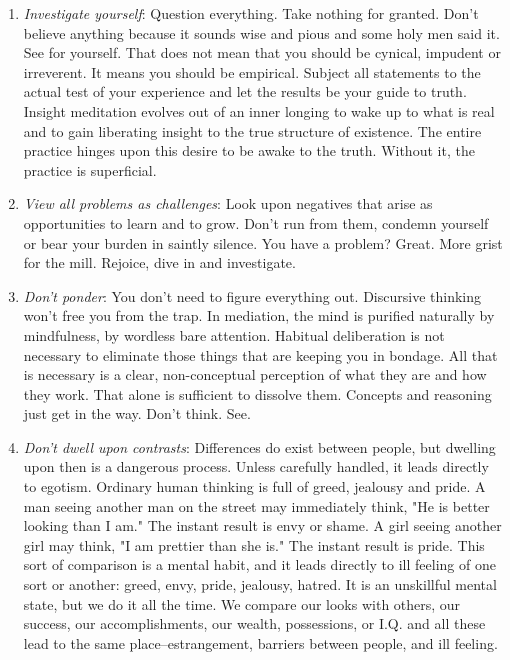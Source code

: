 \begin{enumerate}
\item \emph{Investigate yourself}: Question everything. Take nothing for granted. Don't
believe anything because it sounds wise and pious and some holy men said it. See
for yourself. That does not mean that you should be cynical, impudent or
irreverent. It means you should be empirical. Subject all statements to the
actual test of your experience and let the results be your guide to truth.
Insight meditation evolves out of an inner longing to wake up to what is real
and to gain liberating insight to the true structure of existence. The entire
practice hinges upon this desire to be awake to the truth.
Without it, the practice is superficial.

\item \emph{View all problems as challenges}: Look upon negatives that arise as
opportunities to learn and to grow. Don't run from them, condemn yourself or
bear your burden in saintly silence. You have a problem? Great. More grist for
the mill.  Rejoice, dive in and investigate.

\item \emph{Don't ponder}: You don't need to figure everything out. Discursive
thinking won't free you from the trap. In mediation, the mind is purified
naturally by mindfulness, by wordless bare attention. Habitual deliberation is
not necessary to eliminate those things that are keeping you in bondage. All
that is necessary is a clear, non-conceptual perception of what they are and how
they work. That alone is sufficient to dissolve them. Concepts and reasoning
just get in the way. Don't think. See.

\item \emph{Don't dwell upon contrasts}: Differences do exist between people, but
dwelling upon then is a dangerous process. Unless carefully handled, it leads
directly to egotism. Ordinary human thinking is full of greed, jealousy and
pride. A man seeing another man on the street may immediately think, "He is
better looking than I am." The instant result is envy or shame.
A girl seeing another girl may think, "I am prettier than she is." The instant
result is pride. This sort of comparison is a mental habit, and it leads
directly to ill feeling of one sort or another: greed, envy, pride, jealousy,
hatred. It is an unskillful mental state, but we do it all the time. We compare
our looks with others, our success, our accomplishments, our wealth,
possessions, or I.Q. and all these lead to the same place--estrangement,
barriers between people, and ill feeling.

\end{enumerate}


